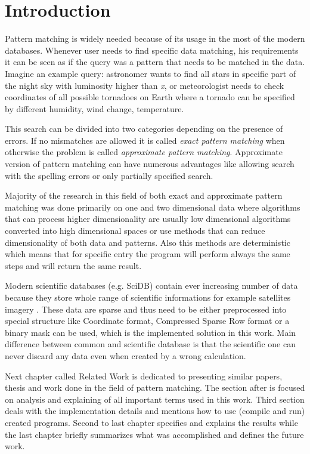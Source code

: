 
\chapter{Introduction}
Pattern matching is widely needed because of its usage in the most of the modern databases. Whenever user needs to find specific data matching, his requirements it can be seen as if the query was a pattern that needs to be matched in the data. Imagine an example query: astronomer wants to find all stars in specific part of the night sky with luminosity higher than \textit{x}, or meteorologist needs to check coordinates of all possible tornadoes on Earth where a tornado can be specified by different humidity, wind change, temperature. \cite{detectRivers}

This search can be divided into two categories depending on the presence of errors. If no mismatches are allowed it is called \textit{exact pattern matching} when otherwise the problem is called \textit{approximate pattern matching}. Approximate version of pattern matching can have numerous advantages like allowing search with the spelling errors or only partially specified search. 

Majority of the research in this field of both exact and approximate pattern matching was done primarily on one and two dimensional data where algorithms that can process higher dimensionality are usually low dimensional algorithms converted into high dimensional spaces or use methods that can reduce dimensionality of both data and patterns. Also this methods are deterministic which means that for specific entry the program will perform always the same steps and will return the same result.

Modern scientific databases (e.g. SciDB) contain ever increasing number of data because they store whole range of scientific informations for example satellites imagery \cite{scidbarch}. These data are sparse and thus need to be either preprocessed into special structure like Coordinate format, Compressed Sparse Row format or a binary mask can be used, which is the implemented solution in this work. Main difference between common and scientific database is that the scientific one can never discard any data even when created by a wrong calculation.

Next chapter called Related Work is dedicated to presenting similar papers, thesis and work done in the field of pattern matching. The section after is focused on analysis and explaining of all important terms used in this work. Third section deals with the implementation details and mentions how to use (compile and run) created programs. Second to last chapter specifies and explains the results while the last chapter briefly summarizes what was accomplished and defines the future work.

